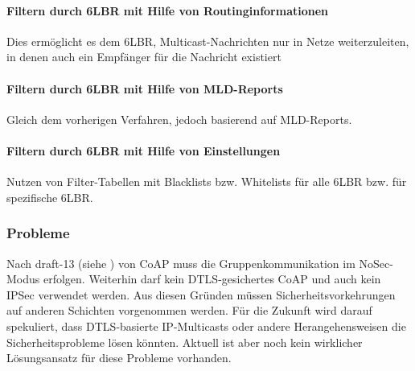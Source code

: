\paragraph{Filtern durch \ac{6LBR} mit Hilfe von Routinginformationen}
Dies ermöglicht es dem \ac{6LBR}, Multicast-Nachrichten nur in Netze weiterzuleiten, in denen auch
ein Empfänger für die Nachricht existiert
\paragraph{Filtern durch \ac{6LBR} mit Hilfe von \ac{MLD}-Reports}
Gleich dem vorherigen Verfahren, jedoch basierend auf \ac{MLD}-Reports.
\paragraph{Filtern durch \ac{6LBR} mit Hilfe von Einstellungen}
Nutzen von Filter-Tabellen mit Blacklists bzw. Whitelists für alle \ac{6LBR} bzw. für spezifische
\ac{6LBR}.
\subsubsection{Probleme}
Nach draft-13 (siehe \cite{draft-ietf-core-coap-13}) von \ac{CoAP} muss die Gruppenkommunikation im
\ac{NoSec}-Modus erfolgen.
Weiterhin darf kein \ac{DTLS}-gesichertes \ac{CoAP} und auch kein \ac{IPSec} verwendet werden.
Aus diesen Gründen müssen Sicherheitsvorkehrungen auf anderen Schichten vorgenommen werden.
Für die Zukunft wird darauf spekuliert, dass \ac{DTLS}-basierte \ac{IP}-Multicasts oder andere
Herangehensweisen die Sicherheitsprobleme lösen könnten.
Aktuell ist aber noch kein wirklicher Lösungsansatz für diese Probleme vorhanden.
